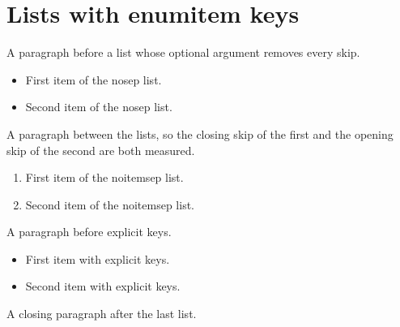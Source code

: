 \documentclass[11pt]{article}
\begin{document}
\section{Lists with enumitem keys}
A paragraph before a list whose optional argument removes every skip.
\begin{itemize}[nosep]
  \item First item of the nosep list.
  \item Second item of the nosep list.
\end{itemize}
A paragraph between the lists, so the closing skip of the first and the
opening skip of the second are both measured.
\begin{enumerate}[noitemsep]
  \item First item of the noitemsep list.
  \item Second item of the noitemsep list.
\end{enumerate}
A paragraph before explicit keys.
\begin{itemize}[topsep=2pt,itemsep=1pt,parsep=0pt]
  \item First item with explicit keys.
  \item Second item with explicit keys.
\end{itemize}
A closing paragraph after the last list.
\end{document}

